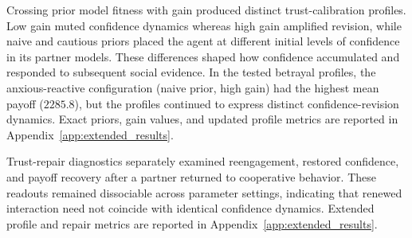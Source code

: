 Crossing prior model fitness with gain produced distinct trust-calibration profiles. Low gain muted confidence dynamics whereas high gain amplified revision, while naive and cautious priors placed the agent at different initial levels of confidence in its partner models. These differences shaped how confidence accumulated and responded to subsequent social evidence. In the tested betrayal profiles, the anxious-reactive configuration (naive prior, high gain) had the highest mean payoff ($2285.8$), but the profiles continued to express distinct confidence-revision dynamics. Exact priors, gain values, and updated profile metrics are reported in Appendix~\ref{app:extended_results}.

Trust-repair diagnostics separately examined reengagement, restored confidence, and payoff recovery after a partner returned to cooperative behavior. These readouts remained dissociable across parameter settings, indicating that renewed interaction need not coincide with identical confidence dynamics. Extended profile and repair metrics are reported in Appendix~\ref{app:extended_results}.
